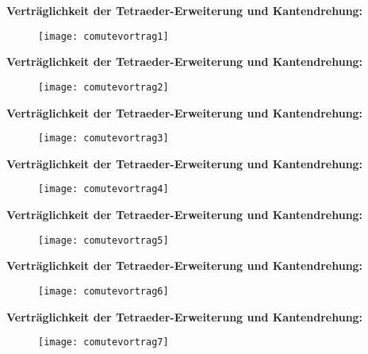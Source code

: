 \documentclass{beamer}
\begin{document}
\begin{frame}
\textbf{Verträglichkeit der Tetraeder-Erweiterung und Kantendrehung:}
\begin{figure}[H]
\texttt{[image: comutevortrag1]}
\end{figure}
\end{frame}
\begin{frame}
\textbf{Verträglichkeit der Tetraeder-Erweiterung und Kantendrehung:}
\begin{figure}[H]
\texttt{[image: comutevortrag2]}
\end{figure}
\end{frame}
\begin{frame}
\textbf{Verträglichkeit der Tetraeder-Erweiterung und Kantendrehung:}
\begin{figure}[H]
\texttt{[image: comutevortrag3]}
\end{figure}
\end{frame}
\begin{frame}
\textbf{Verträglichkeit der Tetraeder-Erweiterung und Kantendrehung:}
\begin{figure}[H]
\texttt{[image: comutevortrag4]}
\end{figure}
\end{frame}
\begin{frame}
\textbf{Verträglichkeit der Tetraeder-Erweiterung und Kantendrehung:}
\begin{figure}[H]
\texttt{[image: comutevortrag5]}
\end{figure}
\end{frame}
\begin{frame}
\textbf{Verträglichkeit der Tetraeder-Erweiterung und Kantendrehung:}
\begin{figure}[H]
\texttt{[image: comutevortrag6]}
\end{figure}
\end{frame}
\begin{frame}
\textbf{Verträglichkeit der Tetraeder-Erweiterung und Kantendrehung:}
\begin{figure}[H]
\texttt{[image: comutevortrag7]}
\end{figure}
\end{frame}
\end{document}
